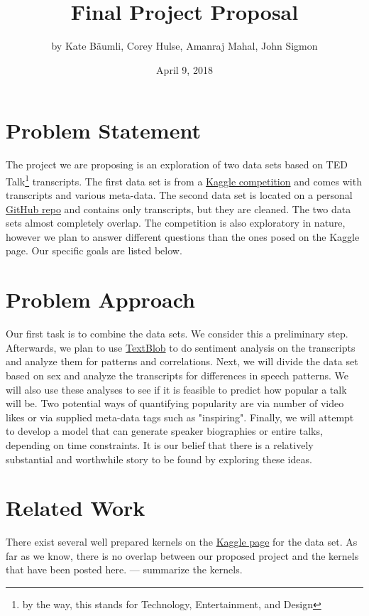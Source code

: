 \documentclass{article}
\title{Final Project Proposal}
\author{by Kate B{\"a}umli, Corey Hulse, Amanraj Mahal, John Sigmon}
\date{April 9, 2018}
\begin{document}
\maketitle

\section{Problem Statement}
The project we are proposing is an exploration of two data sets based on TED Talk\footnote{by the way, this stands for Technology, Entertainment, and Design} transcripts. The first data set is from a \href{https://www.kaggle.com/rounakbanik/ted-talks}{Kaggle competition} and comes with transcripts and various meta-data. The second data set is located on a personal \href{https://github.com/saranyan/TED-Talks}{GitHub repo} and contains only transcripts, but they are cleaned. The two data sets almost completely overlap. The competition is also exploratory in nature, however we plan to answer different questions than the ones posed on the Kaggle page. Our specific goals are listed below.

\section{Problem Approach}
Our first task is to combine the data sets. We consider this a preliminary step. Afterwards, we plan to use \href{http://textblob.readthedocs.io/en/dev/}{TextBlob} to do sentiment analysis on the transcripts and analyze them for patterns and correlations. Next, we will divide the data set based on sex and analyze the transcripts for differences in speech patterns. We will also use these analyses to see if it is feasible to predict how popular a talk will be. Two potential ways of quantifying popularity are via number of video likes or via supplied meta-data tags such as "inspiring". Finally, we will attempt to develop a model that can generate speaker biographies or entire talks, depending on time constraints. It is our belief that there is a relatively substantial and worthwhile story to be found by exploring these ideas.

\section{Related Work}
There exist several well prepared kernels on the \href{https://www.kaggle.com/rounakbanik/ted-talks/kernels}{Kaggle page} for the data set. As far as we know, there is no overlap between our proposed project and the kernels that have been posted here. --- summarize the kernels.
\end{document}
